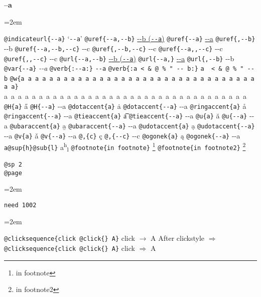 \documentclass{book}
\newenvironment{GNUTexinfopreformatted}{%
  \par\begingroup\obeylines\obeyspaces\frenchspacing}{\endgroup}
\begin{document}
{\huge \bfseries --a}\begin{GNUTexinfopreformatted}
\leftskip=2em \parskip=0pt \parindent=0pt \ttfamily%

\texttt{@indicateurl\{{-}{-}a\}} `\texttt{{-}{-}a}'
\texttt{@uref\{{-}{-}a,{-}{-}b\}} \href{--a}{{-}{-}b (\nolinkurl{--a})}
\texttt{@uref\{{-}{-}a\}} \url{--a}
\texttt{@uref\{,{-}{-}b\}} {-}{-}b
\texttt{@uref\{{-}{-}a,{-}{-}b,{-}{-}c\}} {-}{-}c
\texttt{@uref\{,{-}{-}b,{-}{-}c\}} {-}{-}c
\texttt{@uref\{{-}{-}a,,{-}{-}c\}} {-}{-}c
\texttt{@uref\{,,{-}{-}c\}} {-}{-}c
\texttt{@url\{{-}{-}a,{-}{-}b\}} \href{--a}{{-}{-}b (\nolinkurl{--a})}
\texttt{@url\{{-}{-}a,\}} \url{--a}
\texttt{@url\{,{-}{-}b\}} {-}{-}b
\texttt{@var\{{-}{-}a\}} \textsl{{-}{-}a}
\texttt{@verb\{:{-}{-}a:\}} \verb:--a:
\texttt{@verb\{:a  < \& @ \% " {-}{-}    b:\}} \verb:a  < & @ % " --    b:
\texttt{@w\{a a a a a a a a a a a a a a a a a a a a a a a a a a a a a a a a a a a\}} \hbox{a a a a a a a a a a a a a a a a a a a a a a a a a a a a a a a a a a a}
\texttt{@H\{a\}} \H{a}
\texttt{@H\{{-}{-}a\}} \H{{-}{-}a}
\texttt{@dotaccent\{a\}} \.{a}
\texttt{@dotaccent\{{-}{-}a\}} \.{{-}{-}a}
\texttt{@ringaccent\{a\}} \r{a}
\texttt{@ringaccent\{{-}{-}a\}} \r{{-}{-}a}
\texttt{@tieaccent\{a\}} \t{a}
\texttt{@tieaccent\{{-}{-}a\}} \t{{-}{-}a}
\texttt{@u\{a\}} \u{a}
\texttt{@u\{{-}{-}a\}} \u{{-}{-}a}
\texttt{@ubaraccent\{a\}} \b{a}
\texttt{@ubaraccent\{{-}{-}a\}} \b{{-}{-}a}
\texttt{@udotaccent\{a\}} \d{a}
\texttt{@udotaccent\{{-}{-}a\}} \d{{-}{-}a}
\texttt{@v\{a\}} \v{a}
\texttt{@v\{{-}{-}a\}} \v{{-}{-}a}
\texttt{@,\{c\}} \c{c}
\texttt{@,\{{-}{-}c\}} \c{{-}{-}c}
\texttt{@ogonek\{a\}} \k{a}
\texttt{@ogonek\{{-}{-}a\}} \k{{-}{-}a}
\texttt{a@sup\{h\}@sub\{l\}} a\textsuperscript{h}\textsubscript{l}
\texttt{@footnote\{in footnote\}} \footnote{in footnote}
\texttt{@footnote\{in footnote2\}} \footnote{in footnote2}

\texttt{@sp 2}\leavevmode{}\\
\baselineskip %
\texttt{@page}\leavevmode{}\\
\end{GNUTexinfopreformatted}
\newpage{}%
\phantom{blabla}%
\begin{GNUTexinfopreformatted}
\leftskip=2em \parskip=0pt \parindent=0pt \ttfamily%

\texttt{need 1002}
\end{GNUTexinfopreformatted}
\needspace{1.002pt}%
\begin{GNUTexinfopreformatted}
\leftskip=2em \parskip=0pt \parindent=0pt \ttfamily%

\texttt{@clicksequence\{click @click\{\} A\}} click $\rightarrow{}$ A
After clickstyle $\Rightarrow{}$
\texttt{@clicksequence\{click @click\{\} A\}} click $\Rightarrow{}$ A


\end{GNUTexinfopreformatted}
\end{document}
